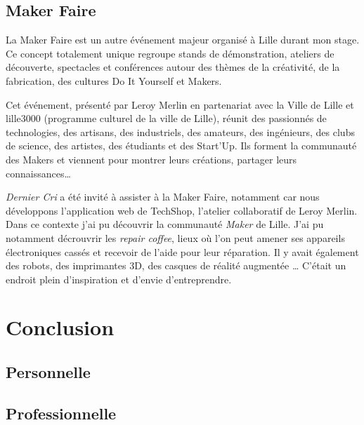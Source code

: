 \documentclass[12pt,a4paper]{article}
\begin{document}
  \bigskip

  \subsection{Maker Faire}\label{maker-faire}

  \bigskip

  La Maker Faire est un autre événement majeur organisé à Lille durant mon
  stage. Ce concept totalement unique regroupe stands de démonstration,
  ateliers de découverte, spectacles et conférences autour des thèmes de
  la créativité, de la fabrication, des cultures Do It Yourself et Makers.

  \bigskip

  Cet événement, présenté par Leroy Merlin en partenariat avec la Ville de
  Lille et lille3000 (programme culturel de la ville de Lille), réunit des
  passionnés de technologies, des artisans, des industriels, des amateurs,
  des ingénieurs, des clubs de science, des artistes, des étudiants et des
  Start'Up. Ils forment la communauté des Makers et viennent pour montrer
  leurs créations, partager leurs connaissances\ldots{}

  \bigskip

  \emph{Dernier Cri} a été invité à assister à la Maker Faire, notamment
  car nous développons l'application web de TechShop, l'atelier
  collaboratif de Leroy Merlin. Dans ce contexte j'ai pu découvrir la
  communauté \emph{Maker} de Lille. J'ai pu notamment décrouvrir les
  \emph{repair coffee}, lieux où l'on peut amener ses appareils
  électroniques cassés et recevoir de l'aide pour leur réparation. Il y
  avait également des robots, des imprimantes 3D, des casques de réalité
  augmentée \ldots{} C'était un endroit plein d'inspiration et d'envie
  d'entreprendre.

  \newpage

  \section{Conclusion}\label{conclusion-2}

  \subsection{Personnelle}\label{personnelle}

  \subsection{Professionnelle}\label{professionnelle}
\end{document}
